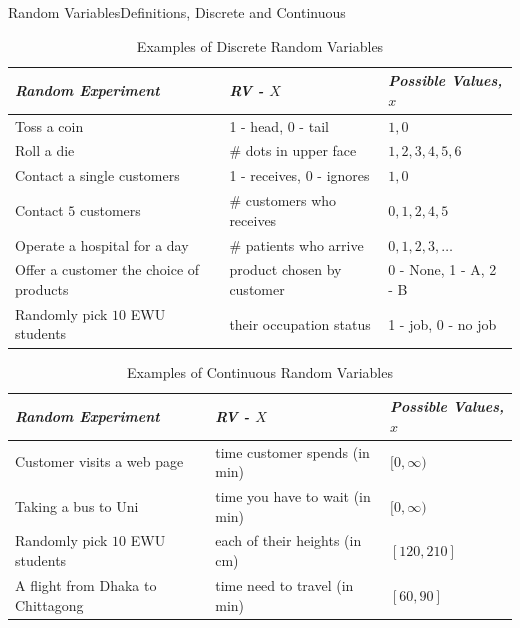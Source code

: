 \documentclass[8pt, usepdftitle = false]{beamer}
\begin{document}
\begin{frame}[allowframebreaks]{Random Variables}{Definitions, Discrete and Continuous}
\begin{itemize}
\small{
\begin{table}[H]
\begin{tabular}{l|l|l} 
\emph{Random Experiment} & \emph{RV - $X$} & \emph{Possible Values, $x$ } \\ \hline
Toss a coin & 1 - head, 0 - tail & $1, 0$  \\
Roll a die & \# dots in upper face & $1,2,3,4,5,6$ \\
Contact a single customers & 1 - receives, 0 - ignores & $1,0$ \\
Contact $5$ customers & \# customers who receives & $0,1,2,4,5$ \\
Operate a hospital for a day & \# patients who arrive & $0,1,2,3, \ldots$ \\
Offer a customer the choice of  products & product chosen by customer & 
0 - None, 1 - A, 2 - B \\
Randomly pick $10$ EWU students & their occupation status & 1 - job, 0 - no job
\end{tabular} 
\caption{Examples of Discrete Random Variables}		
\end{table}
}

\small{
\raggedright
\begin{table}[H]
\begin{tabular}{l|l|l} 
\emph{Random Experiment} & \emph{RV - $X$} & \emph{Possible Values, $x$ } \\ \hline
Customer visits a web page & time customer spends (in min) & $[0, \infty)$ \\
Taking a bus to Uni & time you have to wait (in min) & $[0, \infty)$ \\
Randomly pick $10$ EWU students & each of their heights (in cm) & $[120, 210]$ \\
A flight from Dhaka to Chittagong & time need to travel (in min) & $[60, 90]$ \\

\end{tabular}
\caption{Examples of Continuous Random Variables}		
\end{table}
}


\end{itemize}
\end{frame}




\end{document}
